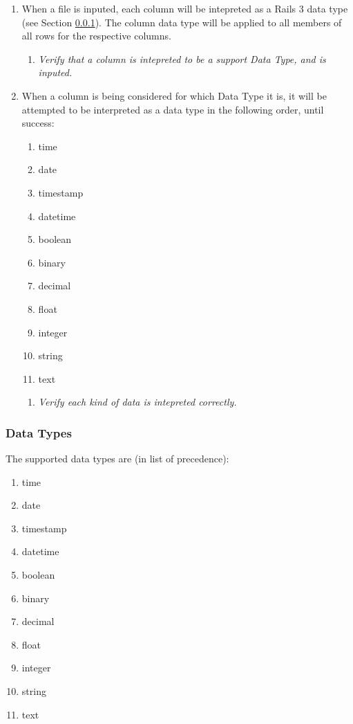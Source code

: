 \begin{enumerate}
		\item When a file is inputed, each column will be intepreted
			as a Rails 3 data type (see Section
			\ref{sec:data_types}). The column data type will be 
			applied to all members of all rows for the respective
			columns.
		\begin{enumerate}
			\item \textit{ Verify that a column is intepreted to
					be a support Data Type, and is inputed.}
		\end{enumerate}

		\item When a column is being considered for which Data Type
			it is, it will be attempted to be interpreted as a 
			data type in the following order, until success:
			\begin{enumerate}
				\item time
				\item date
				\item timestamp
				\item datetime
				\item boolean
				\item binary
				\item decimal
				\item float
				\item integer
				\item string
				\item text
			\end{enumerate}

		\begin{enumerate}
			\item \textit{ Verify each kind of data is intepreted
					correctly.}
		\end{enumerate}

	\end{enumerate}


\subsubsection{Data Types}
\label{sec:data_types}

The supported data types are (in list of precedence):
\begin{enumerate}
	\item time
	\item date
	\item timestamp
	\item datetime
	\item boolean
	\item binary
	\item decimal
	\item float
	\item integer
	\item string
	\item text
\end{enumerate}
